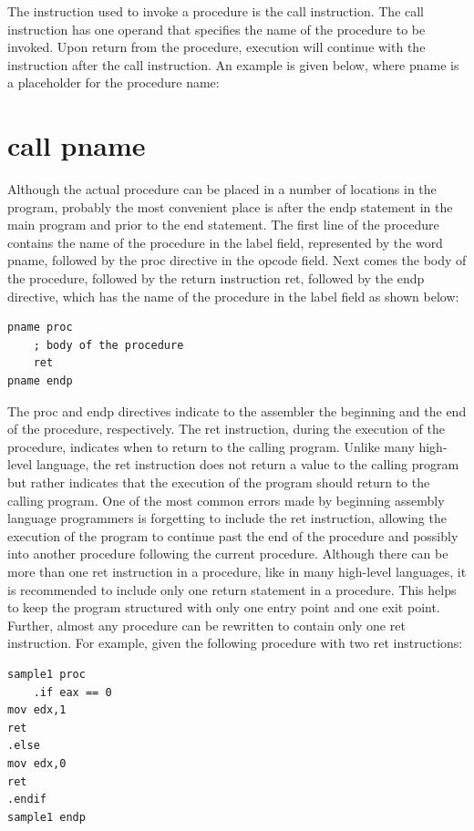 \documentclass[10pt]{book}
\begin{document}
\begin{center}
\begin{center}
The instruction used to invoke a procedure is the call instruction. The call instruction has one operand that specifies the name of the procedure to be invoked. Upon return from the procedure, execution will continue with the instruction after the call instruction. An example is given below, where pname is a placeholder for the procedure name:

\section*{call pname}
Although the actual procedure can be placed in a number of locations in the program, probably the most convenient place is after the endp statement in the main program and prior to the end statement. The first line of the procedure contains the name of the procedure in the label field, represented by the word pname, followed by the proc directive in the opcode field. Next comes the body of the procedure, followed by the return instruction ret, followed by the endp directive, which has the name of the procedure in the label field as shown below:

\begin{verbatim}
pname proc
    ; body of the procedure
    ret
pname endp
\end{verbatim}

The proc and endp directives indicate to the assembler the beginning and the end of the procedure, respectively. The ret instruction, during the execution of the procedure, indicates when to return to the calling program. Unlike many high-level language, the ret instruction does not return a value to the calling program but rather indicates that the execution of the program should return to the calling program. One of the most common errors made by beginning assembly language programmers is forgetting to include the ret instruction, allowing the execution of the program to continue past the end of the procedure and possibly into another procedure following the current procedure. Although there can be more than one ret instruction in a procedure, like in many high-level languages, it is recommended to include only one return statement in a procedure. This helps to keep the program structured with only one entry point and one exit point. Further, almost any procedure can be rewritten to contain only one ret instruction. For example, given the following procedure with two ret instructions:

\begin{verbatim}
sample1 proc
    .if eax == 0
mov edx,1
ret
.else
mov edx,0
ret
.endif
sample1 endp
\end{verbatim}


\end{center}
\end{center}
\end{document}
